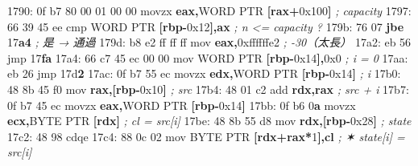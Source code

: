 \documentclass[10pt,a4paper]{article}
\newenvironment{Shaded}{\begin{snugshade}}{\end{snugshade}}
\newcommand{\BaseNTok}[1]{\textcolor[rgb]{0.00,0.00,0.81}{#1}}
\newcommand{\BuiltInTok}[1]{#1}
\newcommand{\CommentTok}[1]{\textcolor[rgb]{0.56,0.35,0.01}{\textit{#1}}}
\newcommand{\ControlFlowTok}[1]{\textcolor[rgb]{0.13,0.29,0.53}{\textbf{#1}}}
\newcommand{\DataTypeTok}[1]{\textcolor[rgb]{0.13,0.29,0.53}{#1}}
\newcommand{\DecValTok}[1]{\textcolor[rgb]{0.00,0.00,0.81}{#1}}
\newcommand{\ErrorTok}[1]{\textcolor[rgb]{0.64,0.00,0.00}{\textbf{#1}}}
\newcommand{\KeywordTok}[1]{\textcolor[rgb]{0.13,0.29,0.53}{\textbf{#1}}}
\newcommand{\NormalTok}[1]{#1}
\newcommand{\OperatorTok}[1]{\textcolor[rgb]{0.81,0.36,0.00}{\textbf{#1}}}
\renewenvironment{Shaded}{%
  \def\FrameCommand{\fboxsep=3.2pt\colorbox{shadecolor}}%
  \MakeFramed{\advance\hsize-\width\FrameRestore\small}%
}{%
  \endMakeFramed
}
\begin{document}
\begin{Shaded}
\begin{Highlighting}[]
\NormalTok{1790: 0f b7 }\DecValTok{80} \DecValTok{00} \DecValTok{01} \DecValTok{00} \DecValTok{00}\NormalTok{   movzx  }\KeywordTok{eax}\OperatorTok{,}\DataTypeTok{WORD} \DataTypeTok{PTR} \OperatorTok{[}\KeywordTok{rax}\OperatorTok{+}\BaseNTok{0x100}\OperatorTok{]} \CommentTok{; capacity}
\NormalTok{1797: 66 39 45 ee            cmp    }\DataTypeTok{WORD} \DataTypeTok{PTR} \OperatorTok{[}\KeywordTok{rbp}\OperatorTok{{-}}\BaseNTok{0x12}\OperatorTok{],}\KeywordTok{ax} \CommentTok{; n \textless{}= capacity ?}
\NormalTok{179b: 76 07                  }\ControlFlowTok{jbe}    \DecValTok{17}\ErrorTok{a4}                  \CommentTok{; 是 → 通過}
\NormalTok{179d: b8 e2 ff ff ff         mov    }\KeywordTok{eax}\OperatorTok{,}\BaseNTok{0xffffffe2}        \CommentTok{; {-}30（太長）}
\NormalTok{17a2: eb }\DecValTok{56}\NormalTok{                  jmp    }\DecValTok{17}\ErrorTok{fa}
\NormalTok{17a4: 66 c7 }\DecValTok{45}\NormalTok{ ec }\DecValTok{00} \DecValTok{00}\NormalTok{      mov    }\DataTypeTok{WORD} \DataTypeTok{PTR} \OperatorTok{[}\KeywordTok{rbp}\OperatorTok{{-}}\BaseNTok{0x14}\OperatorTok{],}\BaseNTok{0x0} \CommentTok{; i = 0}
\NormalTok{17aa: eb }\DecValTok{26}\NormalTok{                  jmp    }\DecValTok{17}\BaseNTok{d}\ErrorTok{2}
\NormalTok{17ac: 0f b7 }\DecValTok{55}\NormalTok{ ec            movzx  }\KeywordTok{edx}\OperatorTok{,}\DataTypeTok{WORD} \DataTypeTok{PTR} \OperatorTok{[}\KeywordTok{rbp}\OperatorTok{{-}}\BaseNTok{0x14}\OperatorTok{]} \CommentTok{; i}
\NormalTok{17b0: 48 8b 45 f0            mov    }\KeywordTok{rax}\OperatorTok{,[}\KeywordTok{rbp}\OperatorTok{{-}}\BaseNTok{0x10}\OperatorTok{]}        \CommentTok{; src}
\NormalTok{17b4: 48 01 c2               add    }\KeywordTok{rdx}\OperatorTok{,}\KeywordTok{rax}               \CommentTok{; src + i}
\NormalTok{17b7: 0f b7 }\DecValTok{45}\NormalTok{ ec            movzx  }\KeywordTok{eax}\OperatorTok{,}\DataTypeTok{WORD} \DataTypeTok{PTR} \OperatorTok{[}\KeywordTok{rbp}\OperatorTok{{-}}\BaseNTok{0x14}\OperatorTok{]}
\NormalTok{17bb: 0f b6 }\DecValTok{0}\ErrorTok{a}\NormalTok{               movzx  }\KeywordTok{ecx}\OperatorTok{,}\DataTypeTok{BYTE} \DataTypeTok{PTR} \OperatorTok{[}\KeywordTok{rdx}\OperatorTok{]}    \CommentTok{; cl = src[i]}
\NormalTok{17be: 48 8b 55 d8            mov    }\KeywordTok{rdx}\OperatorTok{,[}\KeywordTok{rbp}\OperatorTok{{-}}\BaseNTok{0x28}\OperatorTok{]}        \CommentTok{; state}
\NormalTok{17c2: 48 98                  }\BuiltInTok{cdqe}
\NormalTok{17c4: 88 0c 02               }\BuiltInTok{mov}    \DataTypeTok{BYTE} \DataTypeTok{PTR} \OperatorTok{[}\KeywordTok{rdx}\OperatorTok{+}\KeywordTok{rax}\OperatorTok{*}\DecValTok{1}\OperatorTok{],}\KeywordTok{cl} \CommentTok{; ✶ state[i] = src[i]}

\end{Highlighting}
\end{Shaded}
\end{document}
